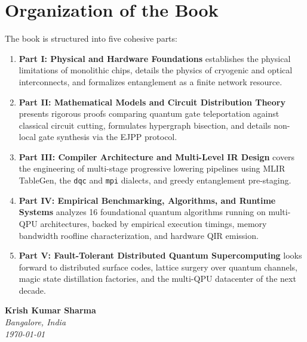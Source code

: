 \section*{Organization of the Book}
The book is structured into five cohesive parts:
\begin{enumerate}
    \item \textbf{Part I: Physical and Hardware Foundations} establishes the physical limitations of monolithic chips, details the physics of cryogenic and optical interconnects, and formalizes entanglement as a finite network resource.
    \item \textbf{Part II: Mathematical Models and Circuit Distribution Theory} presents rigorous proofs comparing quantum gate teleportation against classical circuit cutting, formulates hypergraph bisection, and details non-local gate synthesis via the EJPP protocol.
    \item \textbf{Part III: Compiler Architecture and Multi-Level IR Design} covers the engineering of multi-stage progressive lowering pipelines using MLIR TableGen, the \texttt{dqc} and \texttt{mpi} dialects, and greedy entanglement pre-staging.
    \item \textbf{Part IV: Empirical Benchmarking, Algorithms, and Runtime Systems} analyzes 16 foundational quantum algorithms running on multi-QPU architectures, backed by empirical execution timings, memory bandwidth roofline characterization, and hardware QIR emission.
    \item \textbf{Part V: Fault-Tolerant Distributed Quantum Supercomputing} looks forward to distributed surface codes, lattice surgery over quantum channels, magic state distillation factories, and the multi-QPU datacenter of the next decade.
\end{enumerate}

\vspace{1.5cm}
\noindent\textbf{Krish Kumar Sharma}\\
\textit{Bangalore, India}\\
\textit{\today}
